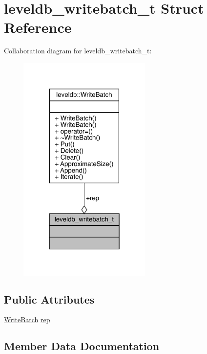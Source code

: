\hypertarget{structleveldb__writebatch__t}{}\section{leveldb\+\_\+writebatch\+\_\+t Struct Reference}
\label{structleveldb__writebatch__t}


Collaboration diagram for leveldb\+\_\+writebatch\+\_\+t\+:
\nopagebreak
\begin{figure}[H]
\begin{center}
\leavevmode
\includegraphics[width=187pt]{structleveldb__writebatch__t__coll__graph}
\end{center}
\end{figure}
\subsection*{Public Attributes}
\begin{DoxyCompactItemize}
\item 
\mbox{\hyperlink{classleveldb_1_1_write_batch}{Write\+Batch}} \mbox{\hyperlink{structleveldb__writebatch__t_ac96538c849db578bea786bf29fae6e5f}{rep}}
\end{DoxyCompactItemize}


\subsection{Member Data Documentation}
\mbox{\label{structleveldb__writebatch__t_ac96538c849db578bea786bf29fae6e5f}} 
